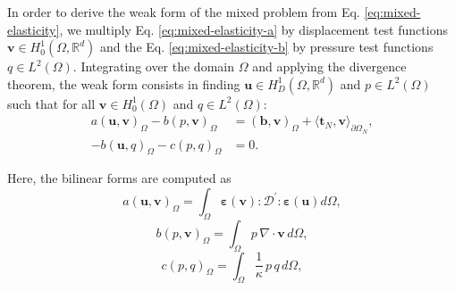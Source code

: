 \documentclass[english,11pt,3p,number,sort&compress]{elsarticle}
\begin{document}
In order to derive the weak form of the mixed problem from Eq. \eqref{eq:mixed-elasticity}, we multiply Eq. \eqref{eq:mixed-elasticity-a} by displacement test functions $\bm{v} \in H^1_0(\Omega,\mathbb{R}^d)$ and the Eq. \eqref{eq:mixed-elasticity-b} by pressure test functions $q \in L^2(\Omega)$. Integrating over the domain $\Omega$ and applying the divergence theorem, the weak form consists in finding $\bm{u} \in H^1_D(\Omega,\mathbb{R}^d)$ and $p \in L^2(\Omega)$ such that for all $\bm{v} \in H^1_0(\Omega)$ and $q \in L^2(\Omega)$:
\begin{subequations} \label{eq:weak-mixed}
	\begin{align}
		a\left(\bm{u},\bm{v}\right)_\Omega - b\left( p, \bm{v}\right)_\Omega &= \left(\bm{b},\bm{v}\right)_\Omega + \langle\bm{t}_N,\bm{v}\rangle_{\partial\Omega_N} ,\label{eq:weak-mixed-a}\\ 
		-b\left(\bm{u}, q\right)_\Omega - c\left(p,q \right)_\Omega &= 0 . \label{eq:weak-mixed-b}
	\end{align}
\end{subequations}

\noindent Here, the bilinear forms are computed as
\begin{equation*}
	a\left(\bm{u},\bm{v}\right)_\Omega = \int_{\Omega} \bm{\varepsilon}(\bm{v}) : \mathcal{D}^{'} : \bm{\varepsilon}(\bm{u}) d\Omega ,
\end{equation*}
\begin{equation*}
	b\left(p, \bm{v}\right)_\Omega = \int_{\Omega} p \,\nabla \cdot \bm{v} \, d\Omega ,
\end{equation*}
\begin{equation*}
	c\left(p,q \right)_\Omega = \int_{\Omega} \frac{1}{\kappa} \,p \,q \, d\Omega ,
\end{equation*}
\end{document}
